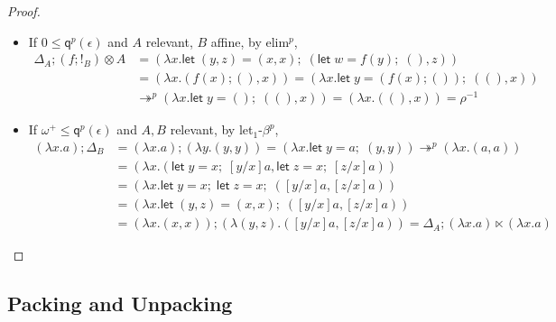 \documentclass[acmsmall,screen,anonymous,review]{acmart}
\newcommand{\mc}[1]{\ensuremath{\mathcal{#1}}}
\newcommand{\ms}[1]{\ensuremath{\mathsf{#1}}}
\newcommand{\letexpr}[3]{\ensuremath{\ms{let}\;#1 = #2;\;#3}}
\newcommand{\cref}{\twoheadrightarrow}
\newcommand{\brle}[1]{{\textsf{#1}}}
\newcommand{\tmor}[1]{{!}_{#1}}
\newcommand{\dmor}[1]{{\Delta}_{#1}}
\newcommand{\subiterexp}{\texorpdfstring{\(\lambda_{\ms{iter}}\)}{lambda-iter}}
\newcommand{\alquant}{\ms{q}}
\begin{document}
\begin{proof}
\begin{itemize}
\begin{align*}
  (\lambda x.a) ; {!}_B &= (\lambda x. \letexpr{y}{a}{()}) \cref^p (\lambda x.()) = {!}_A
  \end{align*}
  \item If $0 \leq \alquant^p(\epsilon)$ and $A$ relevant, $B$ affine, by \brle{elim$^p$}, 
  \begin{align*}
  \dmor{A} ; (f ; \tmor{B}) \otimes A &= (\lambda x. 
    \letexpr{(y, z)}{(x, x)}{(\letexpr{w}{f(y)}{()}, z)})
    \\
    &= (\lambda x. (f(x) ; (), x)) = (\lambda x . \letexpr{y}{(f(x) ; ())}{((), x)}) \\
    & \cref^p (\lambda x. \letexpr{y}{()}{((), x)})
      = (\lambda x. ((), x)) = \rho^{-1}
  \end{align*}
  \item If $\omega^+ \leq \alquant^p(\epsilon)$ and $A, B$ relevant, by \brle{let$_1$-$\beta^p$}, 
  \begin{align*}
    (\lambda x.a) ; \dmor{B} &= (\lambda x.a) ; (\lambda y.(y, y)) 
    = (\lambda x.\letexpr{y}{a}{(y, y)})
    \cref^p (\lambda x. (a, a)) \\
    &= (\lambda x. (\letexpr{y}{x}{[y/x]a}, \letexpr{z}{x}{[z/x]a})) \\
    &= (\lambda x. \letexpr{y}{x}{\letexpr{z}{x}{([y/x]a, [z/x]a)}}) \\
    &= (\lambda x . \letexpr{(y, z)}{(x, x)}{([y/x]a, [z/x]a)}) \\
    &= (\lambda x. (x, x)) ; (\lambda (y, z). ([y/x]a, [z/x]a)) 
     = \dmor{A} ; (\lambda x.a) \ltimes (\lambda x.a)
  \end{align*}
\end{itemize}
\end{proof}

\subsection{Packing and Unpacking}

\label{apx:packing}
\end{document}
